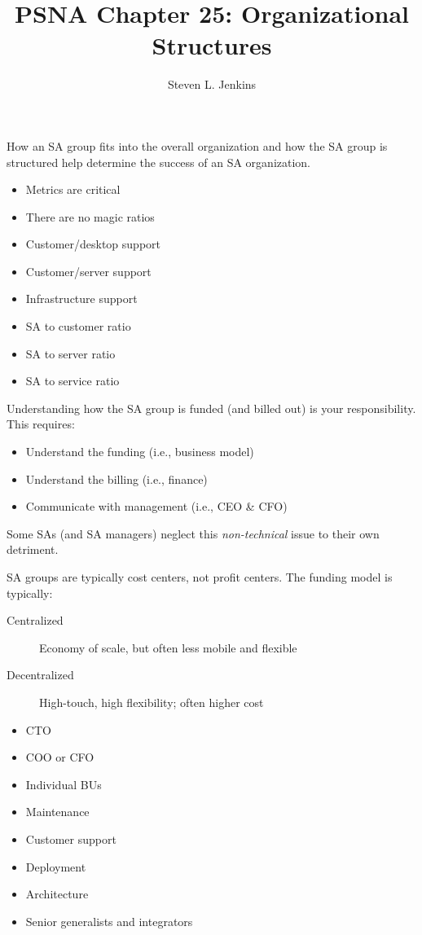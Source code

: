 \documentclass{slides}
\title{PSNA Chapter 25: Organizational Structures}
\author{Steven L. Jenkins}
\newcommand{\bi}{\begin{itemize}}
\newcommand{\ei}{\end{itemize}}
\newcommand{\bd}{\begin{description}}
\newcommand{\ed}{\end{description}}
\begin{document}

How an SA group fits into the overall organization and how the SA group
is structured help determine the success of an SA organization.


\bi
\item Metrics are critical
\item There are no magic ratios
\ei


\bi
\item Customer/desktop support
\item Customer/server support
\item Infrastructure support
\item SA to customer ratio
\item SA to server  ratio
\item SA to service ratio
\ei


Understanding how the SA group is funded (and billed out) is your
responsibility.  This requires:

\bi
\item Understand the funding (i.e., business model)
\item Understand the billing (i.e., finance)
\item Communicate with management (i.e., CEO \& CFO)
\ei

Some SAs (and SA managers) neglect this \emph{non-technical} issue to their
own detriment.


SA groups are typically cost centers, not profit centers.  The funding
model is typically:

\bd
\item[Centralized] Economy of scale, but often less mobile and flexible
\item[Decentralized] High-touch, high flexibility; often higher cost
\ed


\bi
\item CTO
\item COO or CFO
\item Individual BUs
\ei


\bi
\item Maintenance
\item Customer support
\item Deployment
\item Architecture
\item Senior generalists and integrators
\ei
\end{document}
